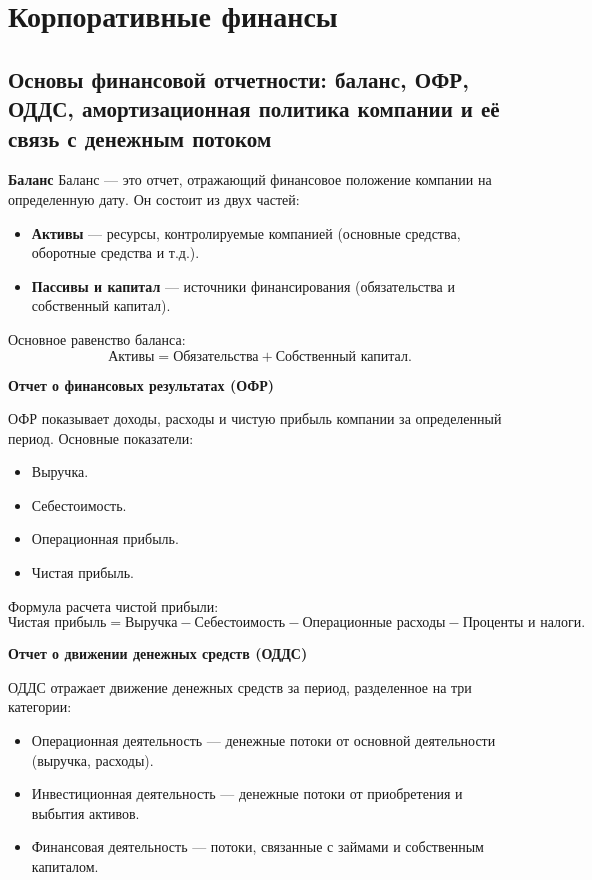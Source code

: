 \section{Корпоративные финансы}

\subsection{Основы финансовой отчетности: баланс, ОФР, ОДДС, амортизационная политика компании и её связь с денежным потоком}

\textbf{Баланс}
Баланс --- это отчет, отражающий финансовое положение компании на определенную дату. Он состоит из двух частей:
\begin{itemize}
    \item \textbf{Активы} --- ресурсы, контролируемые компанией (основные средства, оборотные средства и т.д.).
    \item \textbf{Пассивы и капитал} --- источники финансирования (обязательства и собственный капитал).
\end{itemize}
Основное равенство баланса: 
\begin{equation}
    \text{Активы} = \text{Обязательства} + \text{Собственный капитал}.
\end{equation}

\textbf{Отчет о финансовых результатах (ОФР)}

ОФР показывает доходы, расходы и чистую прибыль компании за определенный период. Основные показатели:
\begin{itemize}
    \item Выручка.
    \item Себестоимость.
    \item Операционная прибыль.
    \item Чистая прибыль.
\end{itemize}

Формула расчета чистой прибыли:
\begin{equation}
    \text{Чистая прибыль} = \text{Выручка} - \text{Себестоимость} - \text{Операционные расходы} - \text{Проценты и налоги}.
\end{equation}


\textbf{Отчет о движении денежных средств (ОДДС)}

ОДДС отражает движение денежных средств за период, разделенное на три категории:
\begin{itemize}
    \item Операционная деятельность --- денежные потоки от основной деятельности (выручка, расходы).
    \item Инвестиционная деятельность --- денежные потоки от приобретения и выбытия активов.
    \item Финансовая деятельность --- потоки, связанные с займами и собственным капиталом.
\end{itemize}

